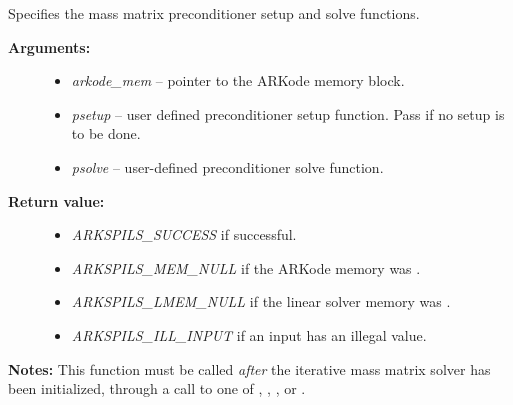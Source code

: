 \documentclass[letterpaper,10pt,english]{sphinxmanual}
\begin{document}

\begin{fulllineitems}
\label{c_interface/User_callable:c.ARKSpilsSetMassPreconditioner}
Specifies the mass matrix preconditioner setup and solve functions.
\begin{description}
\item[{\textbf{Arguments:}}] \leavevmode\begin{itemize}
\item {} 
\emph{arkode\_mem} -- pointer to the ARKode memory block.

\item {} 
\emph{psetup} -- user defined preconditioner setup function.  Pass
 if no setup is to be done.

\item {} 
\emph{psolve} -- user-defined preconditioner solve function.

\end{itemize}

\item[{\textbf{Return value:}}] \leavevmode\begin{itemize}
\item {} 
\emph{ARKSPILS\_SUCCESS} if successful.

\item {} 
\emph{ARKSPILS\_MEM\_NULL} if the ARKode memory was .

\item {} 
\emph{ARKSPILS\_LMEM\_NULL} if the linear solver memory was .

\item {} 
\emph{ARKSPILS\_ILL\_INPUT} if an input has an illegal value.

\end{itemize}

\end{description}

\textbf{Notes:} This function must be called \emph{after} the iterative mass
matrix solver has been initialized, through a call to one of
{\hyperref[c_interface/User_callable:c.ARKMassSpgmr]{\emph{}}}, {\hyperref[c_interface/User_callable:c.ARKMassSpbcg]{\emph{}}},
{\hyperref[c_interface/User_callable:c.ARKMassSptfqmr]{\emph{}}}, {\hyperref[c_interface/User_callable:c.ARKMassSpfgmr]{\emph{}}} or
{\hyperref[c_interface/User_callable:c.ARKMassPcg]{\emph{}}}.


\end{fulllineitems}
\end{document}
